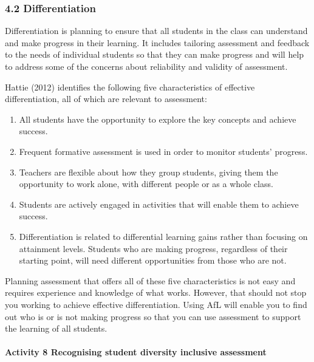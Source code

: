 \documentclass[letterpaper,10pt,english]{sphinxmanual}
\begin{document}
\subsubsection{4.2 Differentiation}
\label{\detokenize{content/session_00/Part_00_04:4.2-Differentiation}}
Differentiation is planning to ensure that all students in the class can understand and make progress in their learning. It includes tailoring assessment and feedback to the needs of individual students so that they can make progress and will help to address some of the concerns about reliability and validity of assessment.

Hattie (2012) identifies the following five characteristics of effective differentiation, all of which are relevant to assessment:
\begin{enumerate}
%
\item {} 
All students have the opportunity to explore the key concepts and achieve success.

\item {} 
Frequent formative assessment is used in order to monitor students’ progress.

\item {} 
Teachers are flexible about how they group students, giving them the opportunity to work alone, with different people or as a whole class.

\item {} 
Students are actively engaged in activities that will enable them to achieve success.

\item {} 
Differentiation is related to differential learning gains rather than focusing on attainment levels. Students who are making progress, regardless of their starting point, will need different opportunities from those who are not.

\end{enumerate}

Planning assessment that offers all of these five characteristics is not easy and requires experience and knowledge of what works. However, that should not stop you working to achieve effective differentiation. Using AfL will enable you to find out who is or is not making progress so that you can use assessment to support the learning of all students.


\paragraph{Activity 8 Recognising student diversity \textendash{} inclusive assessment}
\label{\detokenize{content/session_00/Part_00_04:Activity-8-Recognising-student-diversity-_-inclusive-assessment}}
\end{document}
